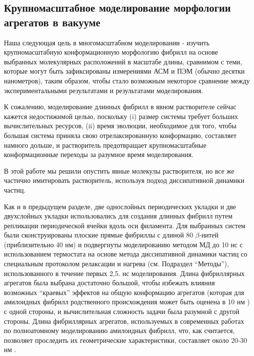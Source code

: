\subsection{Крупномасштабное моделирование морфологии агрегатов в вакууме}

    Наша следующая цель в многомасштабном моделировании - изучить крупномасштабную конформационную морфологию фибрилл на основе выбранных молекулярных расположений в масштабе длины, сравнимом с теми, которые могут быть зафиксированы измерениями АСМ и ПЭМ (обычно десятки нанометров), таким образом, чтобы стало возможным некоторое сравнение между экспериментальными результатами и результатами моделирования.
    
    К сожалению, моделирование длинных фибрилл в явном растворителе сейчас кажется недостижимой целью, поскольку (i) размер системы требует больших вычислительных ресурсов, (ii) время эволюции, необходимое для того, чтобы большая система приняла свою отрелаксированную конформацию, составляет намного дольше, и растворитель предотвращает крупномасштабные конформационные переходы за разумное время моделирования.
    
    В этой работе мы решили опустить явные молекулы растворителя, но все же частично имитировать растворитель, используя подход диссипативной динамики частиц.

    Как и в предыдущем разделе, две однослойных периодических укладки и две двухслойных укладки использовались для создания длинных фибрилл путем репликации периодической ячейки вдоль оси филамента. Для выбранных систем были сконструированы плоские прямые фибриллы с длиной 80 $\beta$-нитей (приблизительно 40 нм) и подвергнуты моделированию методом МД до 10 нс с использованием термостата на основе метода диссипативной динамики частиц со специальным протоколом релаксации и нагрева (см. Подраздел ``Методы''), использованного в течение первых 2,5. нс моделирования. Длина фибриллярных агрегатов была выбрана достаточно большой, чтобы избежать влияния возможных ``краевых'' эффектов на общую конформацию агрегатов (которая для амилоидных фибрилл родственного происхождения может быть оценена в 10 нм \cite{xu_alzheimers_2010}) с одной стороны, и вычислительная сложность задачи была разумной с другой стороны. Длина фибриллярных агрегатов, используемых в современных работах по полноатомному моделированию амилоидных фибрилл, что, как считается, позволяет проследить их геометрические характеристики, составляет около 20-30 нм \cite{paparcone_atomistic_2010,paparcone_microscale_2009}.

